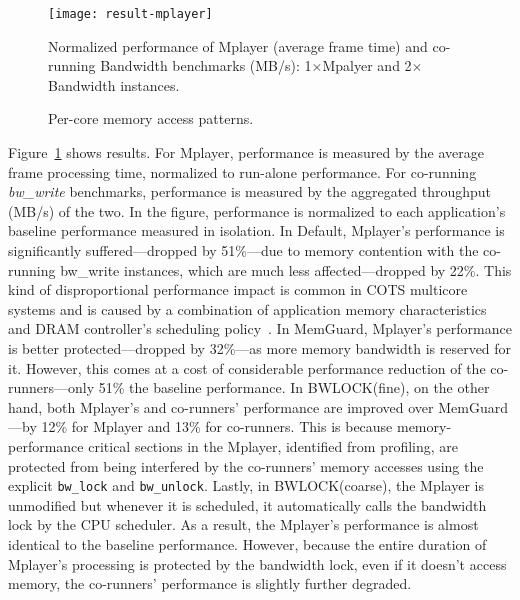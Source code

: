 \documentclass[times, 10pt,onecolumn]{article}
\begin{document}
\begin{figure}
\centering
\texttt{[image: result-mplayer]}
\caption{Normalized performance of Mplayer (average frame time) and
co-running Bandwidth benchmarks (MB/s): 1$\times$Mpalyer and 2$\times$Bandwidth instances.}
\label{fig:result-mplayer}
\end{figure}

\begin{figure*}
\centering
\centering
{}
\caption{Per-core memory access patterns. }
\label{fig:percore-view}
\end{figure*}


Figure~\ref{fig:result-mplayer} shows results. For Mplayer,
performance is measured by the average frame processing time,
normalized to run-alone performance. For co-running \emph{bw\_write}
benchmarks, performance is measured by the aggregated throughput
(MB/s) of the two. In the figure, performance is normalized to each
application's baseline performance measured in isolation. In Default,
Mplayer's performance is significantly suffered---dropped by 51\%---due to
memory contention with the co-running bw\_write instances, which are
much less affected---dropped by 22\%. This kind of disproportional
performance impact is common in COTS multicore systems and is caused
by a combination of application memory characteristics and DRAM
controller's scheduling
policy~\cite{moscibroda2007memory,kim2010thread}.
In MemGuard, Mplayer's performance is better protected---dropped by
32\%---as more memory bandwidth is reserved for it. However, this
comes at a cost of considerable performance reduction of the
co-runners---only 51\% the baseline performance. In BWLOCK(fine), on
the other hand, both Mplayer's and co-runners' performance are
improved over MemGuard---by 12\% for Mplayer and 13\% for
co-runners. This is because memory-performance critical sections in
the Mplayer, identified from profiling, are protected from being
interfered by the co-runners' memory accesses using the explicit
\texttt{bw\_lock} and \texttt{bw\_unlock}. Lastly, in BWLOCK(coarse),
the Mplayer is unmodified but whenever it is scheduled, it
automatically calls the bandwidth lock by the CPU scheduler. As a
result, the Mplayer's performance is almost identical to the baseline
performance. However, because the entire duration of Mplayer's
processing is protected by the bandwidth lock, even if it doesn't
access memory, the co-runners' performance is slightly further
degraded.
\end{document}
